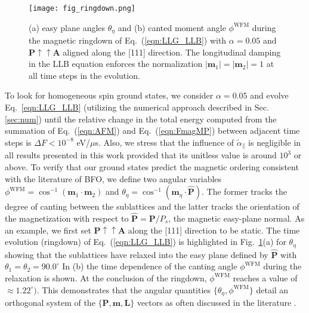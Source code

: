 \documentclass[%
 reprint,
superscriptaddress,
 amsmath,amssymb,
prb,
]{revtex4-1}
\begin{document}
\begin{figure}[h!]\centering
\hspace*{-10pt}\texttt{[image: fig\_ringdown.png]}%
\caption{\label{fig:1ringdown} (a) easy plane angles $\theta_\eta$ and (b) canted moment angle $\phi^\mathrm{WFM}$ during the magnetic ringdown of Eq.~(\ref{eqn:LLG_LLB}) with $\alpha = 0.05$ and $\mathbf{P}\uparrow\uparrow\mathbf{A}$ aligned along the [111] direction. The longitudinal damping in the LLB equation enforces the normalization $|\mathbf{m}_1| = |\mathbf{m}_2| = 1$ at all time steps in the evolution.}
\end{figure}

To look for homogeneous spin ground states, we consider $\alpha = 0.05$ and evolve Eq.~\ref{eqn:LLG_LLB} (utilizing the numerical approach described in Sec. \ref{sec:num}) until the relative change in the total energy computed from the summation of Eq.~(\ref{eqn:AFM}) and Eq.~(\ref{eqn:FmagMP}) between adjacent time steps is $\Delta F < 10^{-8}$ eV/$\mu$s.
%
Also, we stress that the influence of $\tilde\alpha_\parallel$ is negligible in all results presented in this work provided that its unitless value is around $10^3$ or above. 
%
To verify that our ground states predict the magnetic ordering consistent with the literature of BFO, we define two angular variables $\phi^\mathrm{WFM} = \cos^{-1}{\left(\mathbf{m}_1 \cdot \mathbf{m}_2\right)}$ and $\theta_\eta = \cos^{-1}{\left(\mathbf{m}_\eta \cdot \hat{\mathbf{P}}\right)}$.
%
The former tracks the degree of canting between the sublattices and the latter tracks the orientation of the magnetization with respect to $\hat{\mathbf{P}} = \mathbf{P}/P_s$, the magnetic easy-plane normal.
%
As an example, we first set $\mathbf{P}\uparrow\uparrow\mathbf{A}$ along the [111] direction to be static.
%
The time evolution (ringdown) of Eq.~(\ref{eqn:LLG_LLB}) is highlighted in Fig.~\ref{fig:1ringdown}(a) for $\theta_\eta$ showing that the sublattices have relaxed into the easy plane defined by $\hat{\mathbf{P}}$ with $\theta_1 = \theta_2 = 90.0^\circ$
%
In (b) the time dependence of the canting angle $\phi^\mathrm{WFM}$ during the relaxation is shown. 
%
At the conclusion of the ringdown, $\phi^\mathrm{WFM}$ reaches a value of $\approx 1.22^\circ)$.
%
%
This demonstrates that the angular quantities $\{\theta_\eta, \phi^\mathrm{WFM}\}$ detail an orthogonal system of the $\{ \textbf{P}, \textbf{m}, \textbf{L}  \}$ vectors as often discussed in the literature \cite{Heron2014}.
%
\end{document}
